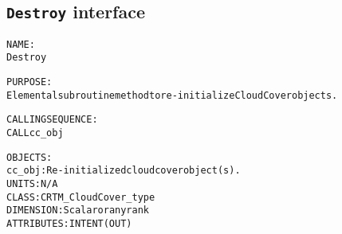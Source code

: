\subsection{\texttt{Destroy} interface}
  \label{sec:Destroy_interface}
  \begin{alltt}
 
  NAME:
    Destroy
 
  PURPOSE:
    Elemental subroutine method to re-initialize CloudCover objects.
 
  CALLING SEQUENCE:
    CALL cc_obj%Destroy()
 
  OBJECTS:
    cc_obj:  Re-initialized cloud cover object(s).
             UNITS:      N/A
             CLASS:      CRTM_CloudCover_type
             DIMENSION:  Scalar or any rank
             ATTRIBUTES: INTENT(OUT)
 
  \end{alltt}
